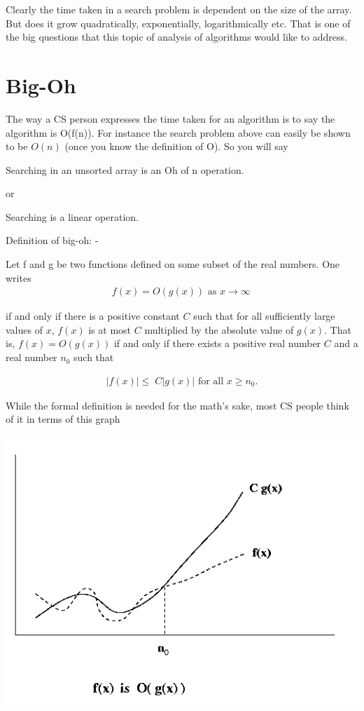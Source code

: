 \documentclass[12pt]{article}
\begin{document}
Clearly the time taken in a search problem is dependent on the size of the array. But does it grow quadratically, exponentially, logarithmically etc. That is one of the big questions that this topic of analysis of algorithms would like to address.

\section*{Big-Oh}

The way a CS person expresses the time taken for an algorithm is to say the algorithm is O(f(n)). For instance the search problem above can easily be shown to be $O(n)$ (once you know the definition of O). So you will say 

Searching in an unsorted array is an Oh of n operation. 

or 

Searching is a linear operation.

Definition of big-oh: - 

Let f and g be two functions defined on some subset of the real numbers. One writes
\begin{align*}
f(x)=O(g(x))\text{ as }x\to\infty\,
\end{align*}

if and only if there is a positive constant $C$ such that for all sufficiently large values of $x$, $f(x)$ is at most $C$ multiplied by the absolute value of $g(x)$. That is, $f(x) = O(g(x))$ if and only if there exists a positive real number $C$ and a real number $n_0$ such that

\begin{align*}
|f(x)| \le \; C |g(x)|\text{ for all }x \ge n_0.
\end{align*}

While the formal definition is needed for the math's sake, most CS people think of it in terms of this graph

\includegraphics[scale=0.5]{bigO.png}
\end{document}
